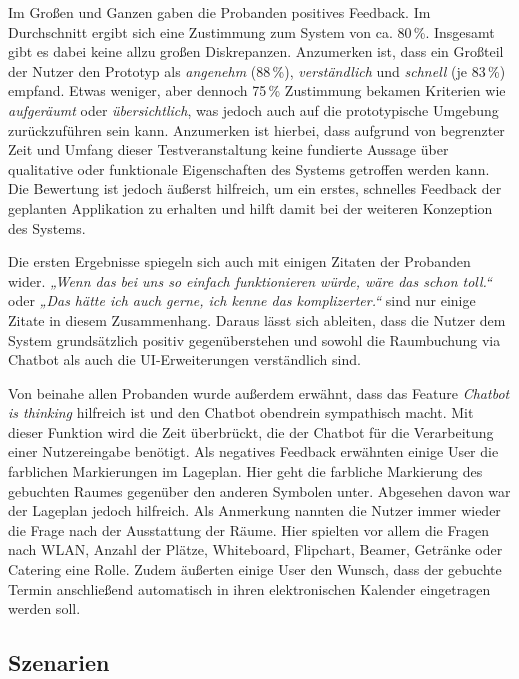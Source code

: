 Im Großen und Ganzen gaben die Probanden positives Feedback. Im Durchschnitt ergibt sich eine Zustimmung zum System von ca. 80\,\%. Insgesamt gibt es dabei keine allzu großen Diskrepanzen. Anzumerken ist, dass ein Großteil der Nutzer den Prototyp als \textit{angenehm} (88\,\%), \textit{verständlich} und \textit{schnell} (je 83\,\%) empfand. Etwas weniger, aber dennoch 75\,\% Zustimmung bekamen Kriterien wie \textit{aufgeräumt} oder \textit{übersichtlich}, was jedoch auch auf die prototypische Umgebung zurückzuführen sein kann. Anzumerken ist hierbei, dass aufgrund von begrenzter Zeit und Umfang dieser Testveranstaltung keine fundierte Aussage über qualitative oder funktionale Eigenschaften des Systems getroffen werden kann. Die Bewertung ist jedoch äußerst hilfreich, um ein erstes, schnelles Feedback der geplanten Applikation zu erhalten und hilft damit bei der weiteren Konzeption des Systems.

Die ersten Ergebnisse spiegeln sich auch mit einigen Zitaten der Probanden wider. \textit{„Wenn das bei uns so einfach funktionieren würde, wäre das schon toll.“} oder \textit{„Das hätte ich auch gerne, ich kenne das komplizerter.“} sind nur einige Zitate in diesem Zusammenhang. Daraus lässt sich ableiten, dass die Nutzer dem System grundsätzlich positiv gegenüberstehen und sowohl die Raumbuchung via Chatbot als auch die \ac{UI}-Erweiterungen verständlich sind. 

Von beinahe allen Probanden wurde außerdem erwähnt, dass das Feature \textit{Chatbot is thinking} hilfreich ist und den Chatbot obendrein sympathisch macht. Mit dieser Funktion wird die Zeit überbrückt, die der Chatbot für die Verarbeitung einer Nutzereingabe benötigt. Als negatives Feedback erwähnten einige User die farblichen Markierungen im Lageplan. Hier geht die farbliche Markierung des gebuchten Raumes gegenüber den anderen Symbolen unter. Abgesehen davon war der Lageplan jedoch hilfreich. Als Anmerkung nannten die Nutzer immer wieder die Frage nach der Ausstattung der Räume. Hier spielten vor allem die Fragen nach WLAN, Anzahl der Plätze, Whiteboard, Flipchart, Beamer, Getränke oder Catering eine Rolle. Zudem äußerten einige User den Wunsch, dass der gebuchte Termin anschließend automatisch in ihren elektronischen Kalender eingetragen werden soll.    

\subsection{Szenarien}
\label{subsec:szenarien}

